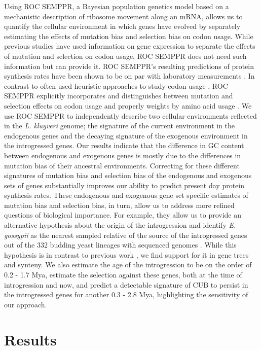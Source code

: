 \documentclass[doublespacing,linenumbers]{bmcart}
\newcommand{\kluyveri}{\textit{L. kluyveri}\xspace}
\newcommand{\gossypii}{\textit{E. gossypii}\xspace}
\newcommand{\ROC}{ROC SEMPPR\xspace}
\newcommand{\GC}{GC content\xspace}
\begin{document}
Using \ROC, a Bayesian population genetics model based on a mechanistic description of ribosome movement along an mRNA, allows us to quantify the cellular environment in which genes have evolved by separately estimating the effects of mutation bias and selection bias on codon usage.
While previous studies have used information on gene expression to separate the effects of mutation and selection on codon usage, \ROC does not need such information but can provide it.
\ROC's resulting predictions of protein synthesis rates have been shown to be on par with laboratory measurements \citep{ShahAndGilchrist2011, gilchrist2015}.
In contrast to often used heuristic approaches to study codon usage \citep{sharp1987, Wright1990, dosreis2004}, \ROC explicitly incorporates and distinguishes between mutation and selection effects on codon usage and properly weights by amino acid usage \citep{cope2018}.
We use \ROC to independently describe two cellular environments reflected in the \kluyveri genome; the signature of the current environment in the endogenous genes and the decaying signature of the exogenous environment in the introgressed genes.
Our results indicate that the difference in \GC between endogenous and exogenous genes is mostly due to the differences in mutation bias of their ancestral environments.
Correcting for these different signatures of mutation bias and selection bias of the endogenous and exogenous sets of genes substantially improves our ability to predict present day protein synthesis rates.
These endogenous and exogenous gene set specific estimates of mutation bias and selection bias, in turn, allow us to address more refined questions of biological importance.
For example, they allow us to provide an alternative hypothesis about the origin of the introgression and identify \gossypii as the nearest sampled relative of the source of the introgressed genes out of the 332 budding yeast lineages with sequenced genomes \citep{shen2018}.
While this hypothesis is in contrast to previous work \citep{payen2009, friedrich2015, vakirlis2016, brion2017}, we find support for it in gene trees and synteny.
We also estimate the age of the introgression to be on the order of 0.2 - 1.7 Mya, estimate the selection against these genes, both at the time of introgression and now, and predict a detectable signature of CUB to persist in the introgressed genes for another 0.3 - 2.8 Mya, highlighting the sensitivity of our approach.

\section*{Results}
\end{document}
